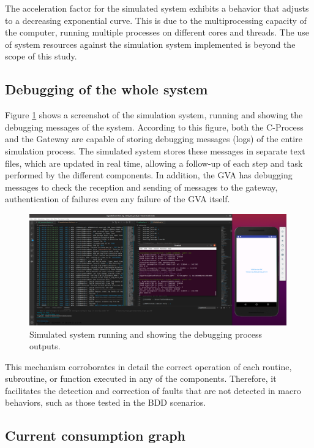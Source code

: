 \documentclass[journal]{IEEEtran}	%
\begin{document}
The acceleration factor for the simulated system exhibits a behavior that adjusts to a decreasing exponential curve. This is due to the multiprocessing capacity of the computer, running multiple processes on different cores and threads. The use of system resources against the simulation system implemented is beyond the scope of this study.


\subsection{Debugging of the whole system}


Figure \ref{fig:simulated-system} shows a screenshot of the simulation system, running and showing the debugging messages of the system. According to this figure, both the C-Process and the Gateway are capable of storing debugging messages (logs) of the entire simulation process. The simulated system stores these messages in separate text files, which are updated in real time, allowing a follow-up of each step and task performed by the different components. In addition, the GVA has debugging messages to check the reception and sending of messages to the gateway, authentication of failures even any failure of the GVA itself.

\begin{figure}[t!]
\centering
\includegraphics[width=0.99\textwidth]{simulated.png}
\caption{Simulated system running and showing the debugging process outputs.}
\label{fig:simulated-system}
\end{figure}

This mechanism corroborates in detail the correct operation of each routine, subroutine, or function executed in any of the components. Therefore, it facilitates the detection and correction of faults that are not detected in macro behaviors, such as those tested in the BDD scenarios.


\subsection{Current consumption graph}
\end{document}
